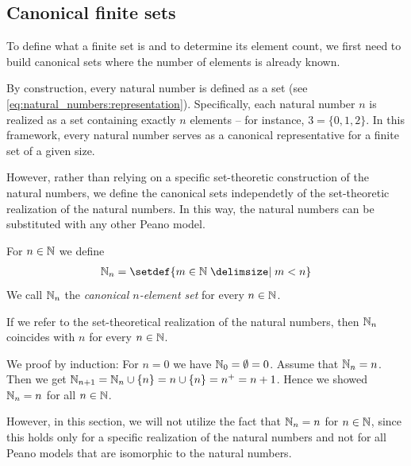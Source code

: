 \subsection{Canonical finite sets}

To define what a finite set is and to determine its element count, we first need to build canonical sets where the number of elements is already known.

By construction, every natural number is defined as a set (see \eqref{eq:natural_numbers:representation}). Specifically, each natural number $n$ is realized as a set containing exactly $n$ elements -- for instance, $3 = \{0, 1, 2\}$. In this framework, every natural number serves as a canonical representative for a finite set of a given size.

However, rather than relying on a specific set-theoretic construction of the natural numbers, we define the canonical sets independetly of the set-theoretic realization of the natural numbers. In this way, the natural numbers can be substituted with any other Peano model.

\begin{definition}\label{definition:finite_infinite:canonical_n_sets}
    For $n\in\mathbb{N}$ we define
    \begin{align}\setN_n=\setdef{m\in\setN\given m<n}\end{align}
    We call $\mathbb{N}_n$ the \emph{canonical $n$-element set} for every $n\in\mathbb{N}$.
\end{definition}

\begin{remarks}
    \begin{remarkenumerate}
        \item If we refer to the set-theoretical realization of the natural numbers, then $\mathbb{N}_n$ coincides with $n$ for every $n\in\mathbb{N}$.
        \begin{miniproof}
            We proof by induction: For $n=0$ we have $\mathbb{N}_0=\emptyset=0$. Assume that $\mathbb{N}_n=n$. Then we get $\mathbb{N}_{n+1}=\mathbb{N}_n\cup\{n\}=n\cup\{n\}=n^+=n+1$. Hence we showed $\mathbb{N}_n=n$ for all $n\in\mathbb{N}$.
        \end{miniproof}
        However, in this section, we will not utilize the fact that $\mathbb{N}_n=n$ for $n\in\mathbb{N}$, since this holds only for a specific realization of the natural numbers and not for all Peano models that are isomorphic to the natural numbers.
    \end{remarkenumerate}
\end{remarks}

